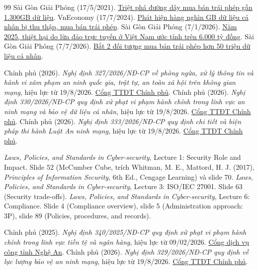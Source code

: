 \begin{thebibliography}{99}
 Sài Gòn Giải Phóng (17/5/2021). \href{https://www.sggp.org.vn/triet-pha-duong-day-mua-ban-trai-phep-gan-1300gb-du-lieu-post594468.html}{Triệt phá đường dây mua bán trái phép gần 1.300GB dữ liệu}.
 VnEconomy (17/7/2024). \href{https://vneconomy.vn/phat-hien-hang-nghin-gb-du-lieu-ca-nhan-bi-thu-thap-mua-ban-trai-phep-trong-do-co-nhieu-du-lieu-nhay-cam.htm}{Phát hiện hàng nghìn GB dữ liệu cá nhân bị thu thập, mua bán trái phép}.
 Sài Gòn Giải Phóng (7/1/2026). \href{https://www.sggp.org.vn/nam-2025-thiet-hai-do-lua-dao-truc-tuyen-o-viet-nam-uoc-tinh-tren-6000-ty-dong-post832336.html}{Năm 2025, thiệt hại do lừa đảo trực tuyến ở Việt Nam ước tính trên 6.000 tỷ đồng}.
 Sài Gòn Giải Phóng (7/7/2026). \href{https://www.sggp.org.vn/bat-2-doi-tuong-mua-ban-trai-phep-hon-50-trieu-du-lieu-ca-nhan-post861086.html}{Bắt 2 đối tượng mua bán trái phép hơn 50 triệu dữ liệu cá nhân}.

 Chính phủ (2026). \textit{Nghị định 327/2026/NĐ-CP về phòng ngừa, xử lý thông tin và hành vi xâm phạm an ninh quốc gia, trật tự, an toàn xã hội trên không gian mạng}, hiệu lực từ 19/8/2026. \href{https://chinhphu.vn/?pageid=27160&docid=219242}{Cổng TTĐT Chính phủ}.
 Chính phủ (2026). \textit{Nghị định 330/2026/NĐ-CP quy định xử phạt vi phạm hành chính trong lĩnh vực an ninh mạng và bảo vệ dữ liệu cá nhân}, hiệu lực từ 19/8/2026. \href{https://chinhphu.vn/?pageid=27160&docid=219266}{Cổng TTĐT Chính phủ}.
 Chính phủ (2026). \textit{Nghị định 333/2026/NĐ-CP quy định chi tiết và biện pháp thi hành Luật An ninh mạng}, hiệu lực từ 19/8/2026. \href{https://chinhphu.vn/?pageid=27160&docid=219244&classid=1&typegroupid=4}{Cổng TTĐT Chính phủ}.

 \textit{Laws, Policies, and Standards in Cyber-security}, Lecture 1: Security Role and Impact. Slide 52 (McCumber Cube, trích Whitman, M. E., Mattord, H. J. (2017), \textit{Principles of Information Security}, 6th Ed., Cengage Learning) và slide 70.
 \textit{Laws, Policies, and Standards in Cyber-security}, Lecture 3: ISO/IEC 27001. Slide 63 (Security trade-offs).
 \textit{Laws, Policies, and Standards in Cyber-security}, Lecture 6: Compliance. Slide 4 (Compliance overview), slide 5 (Administration approach: 3P), slide 89 (Policies, procedures, and records).

 Chính phủ (2025). \textit{Nghị định 340/2025/NĐ-CP quy định xử phạt vi phạm hành chính trong lĩnh vực tiền tệ và ngân hàng}, hiệu lực từ 09/02/2026. \href{https://hcc.nghean.gov.vn/laws/detail/Nghi-dinh-so-340-2025-ND-CP-cua-Chinh-phu-Quy-dinh-ve-xu-phat-vi-pham-hanh-chinh-trong-linh-vuc-tien-te-va-ngan-hang-2090/}{Cổng dịch vụ công tỉnh Nghệ An}.
 Chính phủ (2026). \textit{Nghị định 329/2026/NĐ-CP quy định về lực lượng bảo vệ an ninh mạng}, hiệu lực từ 19/8/2026. \href{https://chinhphu.vn/?pageid=27160&docid=219235}{Cổng TTĐT Chính phủ}.
\end{thebibliography}
